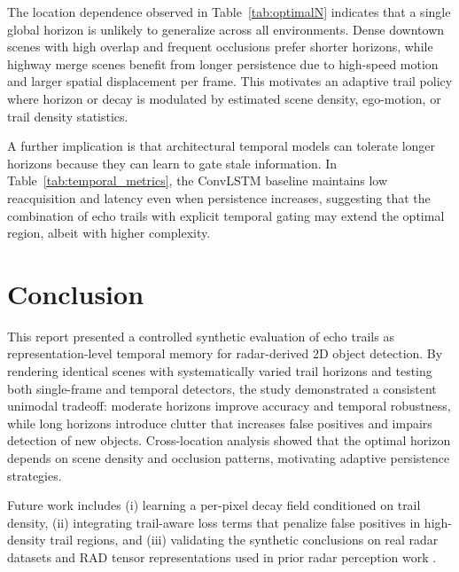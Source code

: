 \documentclass[twocolumn, 10pt]{article}
\begin{document}
The location dependence observed in Table~\ref{tab:optimalN} indicates that a single global horizon is unlikely to generalize across all environments. Dense downtown scenes with high overlap and frequent occlusions prefer shorter horizons, while highway merge scenes benefit from longer persistence due to high-speed motion and larger spatial displacement per frame. This motivates an adaptive trail policy where horizon or decay is modulated by estimated scene density, ego-motion, or trail density statistics.

A further implication is that architectural temporal models can tolerate longer horizons because they can learn to gate stale information. In Table~\ref{tab:temporal_metrics}, the ConvLSTM baseline maintains low reacquisition and latency even when persistence increases, suggesting that the combination of echo trails with explicit temporal gating may extend the optimal region, albeit with higher complexity.

\section{Conclusion}
This report presented a controlled synthetic evaluation of echo trails as representation-level temporal memory for radar-derived 2D object detection. By rendering identical scenes with systematically varied trail horizons and testing both single-frame and temporal detectors, the study demonstrated a consistent unimodal tradeoff: moderate horizons improve accuracy and temporal robustness, while long horizons introduce clutter that increases false positives and impairs detection of new objects. Cross-location analysis showed that the optimal horizon depends on scene density and occlusion patterns, motivating adaptive persistence strategies.

Future work includes (i) learning a per-pixel decay field conditioned on trail density, (ii) integrating trail-aware loss terms that penalize false positives in high-density trail regions, and (iii) validating the synthetic conclusions on real radar datasets and RAD tensor representations used in prior radar perception work \cite{RADDet2021}.



\end{document}
